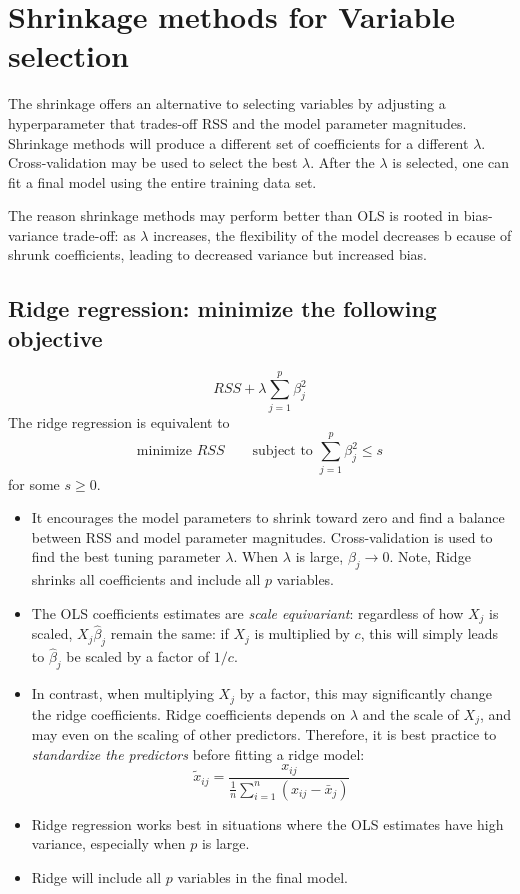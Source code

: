 \documentclass[
  letterpaper,
  DIV=11,
  numbers=noendperiod]{scrreprt}
\begin{document}
\section{Shrinkage methods for Variable
selection}\label{shrinkage-methods-for-variable-selection}

The shrinkage offers an alternative to selecting variables by adjusting
a hyperparameter that trades-off RSS and the model parameter magnitudes.
Shrinkage methods will produce a different set of coefficients for a
different \(\lambda\). Cross-validation may be used to select the best
\(\lambda\). After the \(\lambda\) is selected, one can fit a final
model using the entire training data set.

The reason shrinkage methods may perform better than OLS is rooted in
bias-variance trade-off: as \(\lambda\) increases, the flexibility of
the model decreases b ecause of shrunk coefficients, leading to
decreased variance but increased bias.

\subsection{Ridge regression: minimize the following
objective}\label{ridge-regression-minimize-the-following-objective}

\[
RSS + \lambda \sum_{j=1}^p \beta_j^2
\] The ridge regression is equivalent to \[
\text{minimize } RSS \qquad \text{subject to } \sum_{j=1}^p \beta_j^2 \le s
\] for some \(s\ge 0\).

\begin{itemize}
\item
  It encourages the model parameters to shrink toward zero and find a
  balance between RSS and model parameter magnitudes. Cross-validation
  is used to find the best tuning parameter \(\lambda\). When
  \(\lambda\) is large, \(\beta_j\to 0\). Note, Ridge shrinks all
  coefficients and include all \(p\) variables.
\item
  The OLS coefficients estimates are \emph{scale equivariant}:
  regardless of how \(X_j\) is scaled, \(X_j\hat{\beta}_j\) remain the
  same: if \(X_j\) is multiplied by \(c\), this will simply leads to
  \(\hat{\beta}_j\) be scaled by a factor of \(1/c\).
\item
  In contrast, when multiplying \(X_j\) by a factor, this may
  significantly change the ridge coefficients. Ridge coefficients
  depends on \(\lambda\) and the scale of \(X_j\), and may even on the
  scaling of other predictors. Therefore, it is best practice to
  \emph{standardize the predictors} before fitting a ridge model: \[
  \tilde{x}_{ij} =\frac{x_{ij}}{\frac{1}{n} \sum_{i=1}^n(x_{ij} - \bar{x}_j)}
  \]
\item
  Ridge regression works best in situations where the OLS estimates have
  high variance, especially when \(p\) is large.
\item
  Ridge will include all \(p\) variables in the final model.
\end{itemize}
\end{document}
